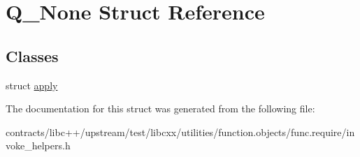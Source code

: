 \hypertarget{struct_q___none}{}\section{Q\+\_\+\+None Struct Reference}
\label{struct_q___none}
\subsection*{Classes}
\begin{DoxyCompactItemize}
\item 
struct \mbox{\hyperlink{struct_q___none_1_1apply}{apply}}
\end{DoxyCompactItemize}


The documentation for this struct was generated from the following file\+:\begin{DoxyCompactItemize}
\item 
contracts/libc++/upstream/test/libcxx/utilities/function.\+objects/func.\+require/invoke\+\_\+helpers.\+h\end{DoxyCompactItemize}
